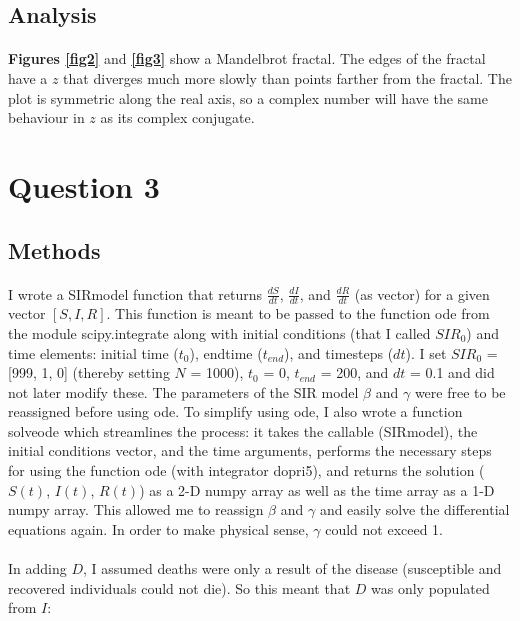 \documentclass{article}
\begin{document}
\subsection{Analysis}

\paragraph{}
\textbf{Figures \ref{fig2}} and \textbf{\ref{fig3}} show a Mandelbrot fractal. The edges of the fractal have a $z$ that diverges much more slowly than points farther from the fractal. The plot is symmetric along the real axis, so a complex number will have the same behaviour in $z$ as its complex conjugate.



\section{Question 3}

\subsection{Methods}

\paragraph{}
I wrote a SIRmodel function that returns $\frac{dS}{dt}$, $\frac{dI}{dt}$, and $\frac{dR}{dt}$ (as vector) for a given vector $[S, I, R]$. This function is meant to be passed to the function ode from the module scipy.integrate along with initial conditions (that I called $SIR_0$) and time elements: initial time ($t_0$), endtime ($t_{end}$), and timesteps ($dt$). I set $SIR_0$ = [999, 1, 0] (thereby setting $N$ = 1000), $t_0$ = 0, $t_{end}$ = 200, and $dt$ = 0.1 and did not later modify these. The parameters of the SIR model $\beta$ and $\gamma$ were free to be reassigned before using ode. To simplify using ode, I also wrote a function solveode which streamlines the process: it takes the callable (SIRmodel), the initial conditions vector, and the time arguments, performs the necessary steps for using the function ode (with integrator dopri5), and returns the solution ($S(t)$, $I(t)$, $R(t)$) as a 2-D numpy array as well as the time array as a 1-D numpy array. This allowed me to reassign $\beta$ and $\gamma$ and easily solve the differential equations again. In order to make physical sense, $\gamma$ could not exceed 1.

\paragraph{}
In adding $D$, I assumed deaths were only a result of the disease (susceptible and recovered individuals could not die). So this meant that $D$ was only populated from $I$:
\end{document}
